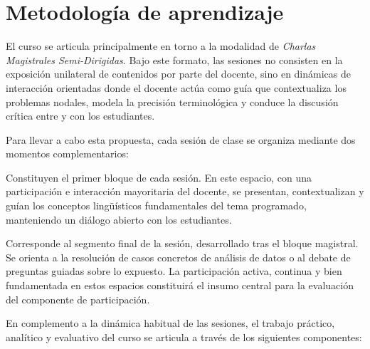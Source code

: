 
%

\section{Metodología de aprendizaje}

El curso se articula principalmente en torno a la modalidad de
\textit{Charlas Magistrales Semi-Dirigidas}. Bajo este formato, las
sesiones no consisten en la exposición unilateral de contenidos
por parte del docente, sino en dinámicas de interacción orientadas
donde el docente actúa como guía que contextualiza los problemas nodales,
modela la precisión terminológica y conduce la discusión crítica
entre y con los estudiantes.

Para llevar a cabo esta propuesta, cada sesión de clase se organiza mediante 
dos momentos complementarios:

\begin{description}[
    style=nextline,
    leftmargin=0pt,
    labelindent=0pt,
    labelwidth=0pt,
    labelsep=0pt,
    itemsep=7pt
]

\item[\textbf{Charlas Magistrales Semi-Dirigidas}]
Constituyen el primer bloque de cada sesión. En este espacio, con una 
participación e interacción mayoritaria del docente, se presentan, 
contextualizan y guían los conceptos lingüísticos fundamentales del tema programado, 
manteniendo un diálogo abierto con los estudiantes.  

\item[\textbf{Espacio de Aplicación y Reflexión}]
Corresponde al segmento final de la sesión, desarrollado tras el bloque magistral. 
Se orienta a la resolución de casos concretos de análisis de datos o al debate de preguntas 
guiadas sobre lo expuesto. La participación activa, continua y bien fundamentada en estos espacios
constituirá el insumo central para la evaluación del componente de participación.

\end{description}

En complemento a la dinámica habitual de las sesiones, el trabajo práctico, analítico y evaluativo del 
curso se articula a través de los siguientes componentes:

